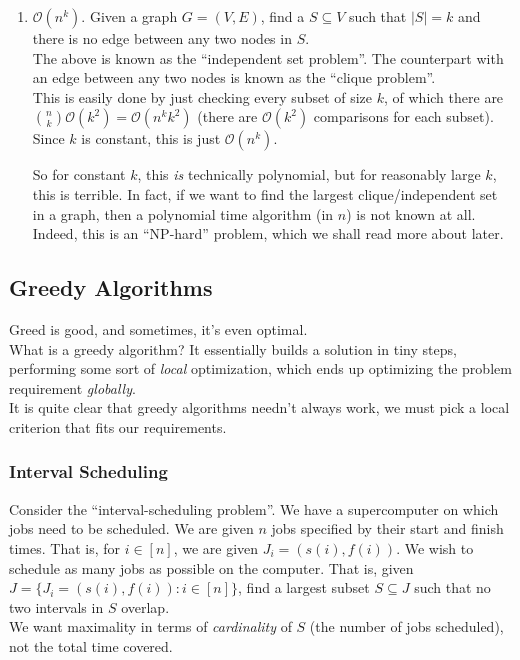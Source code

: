 \begin{enumerate}
	\item $\mathcal{O}(n^k)$. Given a graph $G=(V,E)$, find a $S\subseteq V$ such that $|S|=k$ and there is no edge between any two nodes in $S$.\\
	The above is known as the ``independent set problem''. The counterpart with an edge between any two nodes is known as the ``clique problem''.\\
	This is easily done by just checking every subset of size $k$, of which there are $\binom{n}{k}\mathcal{O}(k^2)=\mathcal{O}(n^k k^2)$ (there are $\mathcal{O}(k^2)$ comparisons for each subset). Since $k$ is constant, this is just $\mathcal{O}(n^k)$.

	So for constant $k$, this \textit{is} technically polynomial, but for reasonably large $k$, this is terrible. In fact, if we want to find the largest clique/independent set in a graph, then a polynomial time algorithm (in $n$) is not known at all. Indeed, this is an ``NP-hard'' problem, which we shall read more about later.

\end{enumerate}


\subsection{Greedy Algorithms}

Greed is good, and sometimes, it's even optimal.\\

What is a greedy algorithm? It essentially builds a solution in tiny steps, performing some sort of \textit{local} optimization, which ends up optimizing the problem requirement \textit{globally}.\\
It is quite clear that greedy algorithms needn't always work, we must pick a local criterion that fits our requirements.\\

\subsubsection{Interval Scheduling}

Consider the ``interval-scheduling problem''. We have a supercomputer on which jobs need to be scheduled. We are given $n$ jobs specified by their start and finish times. That is, for $i\in[n]$, we are given $J_i = (s(i),f(i))$. We wish to schedule as many jobs as possible on the computer. That is, given $J = \{J_i = (s(i),f(i)) : i\in[n]\}$, find a largest subset $S\subseteq J$ such that no two intervals in $S$ overlap.\\
We want maximality in terms of \textit{cardinality} of $S$ (the number of jobs scheduled), not the total time covered.

